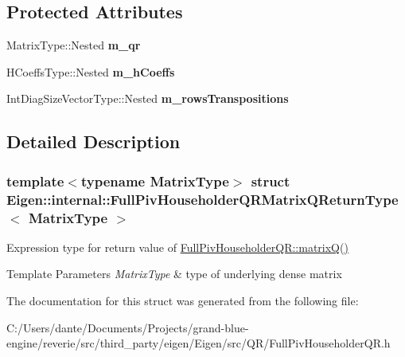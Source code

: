 \subsection*{Protected Attributes}
\begin{DoxyCompactItemize}
\item 
\mbox{\label{struct_eigen_1_1internal_1_1_full_piv_householder_q_r_matrix_q_return_type_a52bad57f1b6f4e9e59435556575772ca}} 
Matrix\+Type\+::\+Nested {\bfseries m\+\_\+qr}
\item 
\mbox{\label{struct_eigen_1_1internal_1_1_full_piv_householder_q_r_matrix_q_return_type_a3518abc98f07cff4e7a3c7b38f226d9e}} 
H\+Coeffs\+Type\+::\+Nested {\bfseries m\+\_\+h\+Coeffs}
\item 
\mbox{\label{struct_eigen_1_1internal_1_1_full_piv_householder_q_r_matrix_q_return_type_ae75bac7d6c6b5d0df7da8d0f9cf8556e}} 
Int\+Diag\+Size\+Vector\+Type\+::\+Nested {\bfseries m\+\_\+rows\+Transpositions}
\end{DoxyCompactItemize}


\subsection{Detailed Description}
\subsubsection*{template$<$typename Matrix\+Type$>$\newline
struct Eigen\+::internal\+::\+Full\+Piv\+Householder\+Q\+R\+Matrix\+Q\+Return\+Type$<$ Matrix\+Type $>$}

Expression type for return value of \mbox{\hyperlink{class_eigen_1_1_full_piv_householder_q_r_ad26dd2d3c002939771d2375e4e051c28}{Full\+Piv\+Householder\+Q\+R\+::matrix\+Q()}} 


\begin{DoxyTemplParams}{Template Parameters}
{\em Matrix\+Type} & type of underlying dense matrix \\
\hline
\end{DoxyTemplParams}


The documentation for this struct was generated from the following file\+:\begin{DoxyCompactItemize}
\item 
C\+:/\+Users/dante/\+Documents/\+Projects/grand-\/blue-\/engine/reverie/src/third\+\_\+party/eigen/\+Eigen/src/\+Q\+R/Full\+Piv\+Householder\+Q\+R.\+h\end{DoxyCompactItemize}
